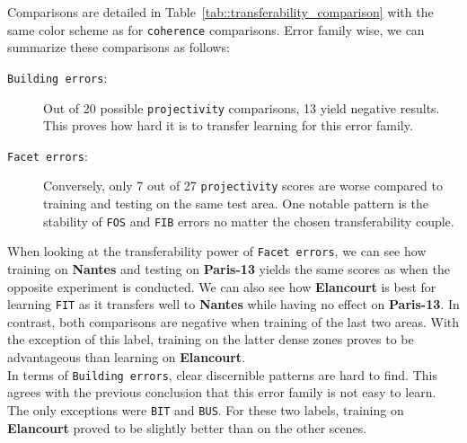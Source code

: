             Comparisons are detailed in Table~\ref{tab::transferability_comparison} with the same color scheme as for \texttt{coherence} comparisons.
            Error family wise, we can summarize these comparisons as follows:
            \begin{description}
                \item[\texttt{Building errors}:] Out of 20 possible \texttt{projectivity} comparisons, 13 yield negative results.
                        This proves how hard it is to transfer learning for this error family.
                \item[\texttt{Facet errors}:] Conversely, only 7 out of 27 \texttt{projectivity} scores are worse compared to training and testing on the same test area.
                        One notable pattern is the stability of \texttt{FOS} and \texttt{FIB} errors no matter the chosen transferability couple.
            \end{description}

            When looking at the transferability power of \texttt{Facet errors}, we can see how training on \textbf{Nantes} and testing on \textbf{Paris-13} yields the same scores as when the opposite experiment is conducted.
            We can also see how \textbf{Elancourt} is best for learning \texttt{FIT} as it transfers well to \textbf{Nantes} while having no effect on \textbf{Paris-13}.
            In contrast, both comparisons are negative when training of the last two areas.
            With the exception of this label, training on the latter dense zones proves to be advantageous than learning on \textbf{Elancourt}.\\
            In terms of \texttt{Building errors}, clear discernible patterns are hard to find.
            This agrees with the previous conclusion that this error family is not easy to learn.
            The only exceptions were \texttt{BIT} and \texttt{BUS}.
            For these two labels, training on \textbf{Elancourt} proved to be slightly better than on the other scenes.

